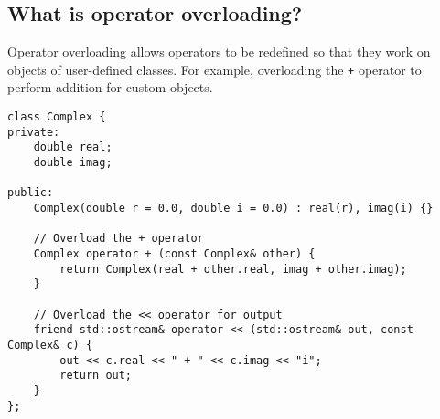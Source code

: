 \subsection{What is operator overloading?}
Operator overloading allows operators to be redefined so that they work on objects of user-defined classes. For example, overloading the \texttt{+} operator to perform addition for custom objects.
\begin{tcolorbox}[title=Operator Overloading]
\begin{verbatim}
class Complex {
private:
    double real;
    double imag;
    
public:
    Complex(double r = 0.0, double i = 0.0) : real(r), imag(i) {}
    
    // Overload the + operator
    Complex operator + (const Complex& other) {
        return Complex(real + other.real, imag + other.imag);
    }
    
    // Overload the << operator for output
    friend std::ostream& operator << (std::ostream& out, const Complex& c) {
        out << c.real << " + " << c.imag << "i";
        return out;
    }
};
\end{verbatim}
\end{tcolorbox}

